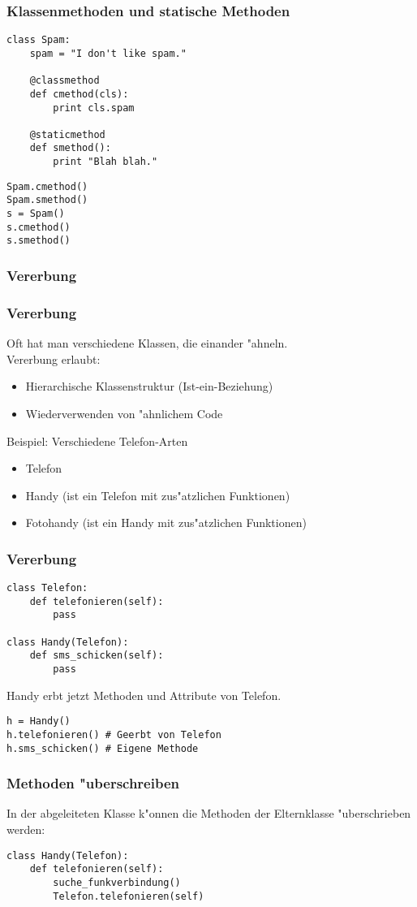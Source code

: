 \begin{frame}[fragile]
\frametitle{Klassenmethoden und statische Methoden}
\begin{lstlisting}[style=Python]
class Spam:
    spam = "I don't like spam."

    @classmethod
    def cmethod(cls):
        print cls.spam
       
    @staticmethod
    def smethod():
        print "Blah blah."
\end{lstlisting}
\begin{lstlisting}[style=Python]
Spam.cmethod()
Spam.smethod()
s = Spam()
s.cmethod()
s.smethod()
\end{lstlisting}
\end{frame}
\frametitle{Vererbung}

\begin{frame}
\frametitle{Vererbung}
Oft hat man verschiedene Klassen, die einander "ahneln.\\
\alert{Vererbung} erlaubt:
\begin{itemize}
\item Hierarchische Klassenstruktur (Ist-ein-Beziehung)
\item Wiederverwenden von "ahnlichem Code
\end{itemize}
\vspace{5mm}
Beispiel: Verschiedene Telefon-Arten
\begin{itemize}
\item Telefon
\item Handy (ist ein Telefon mit zus"atzlichen Funktionen)
\item Fotohandy (ist ein Handy mit zus"atzlichen Funktionen)
\end{itemize}
\end{frame}

\begin{frame}[fragile]
\frametitle{Vererbung}
\begin{lstlisting}[style=Python]
class Telefon:
    def telefonieren(self):
        pass

class Handy(Telefon):
    def sms_schicken(self):
        pass
\end{lstlisting}
Handy erbt jetzt Methoden und Attribute von Telefon.
\begin{lstlisting}[style=Python]
h = Handy()
h.telefonieren() # Geerbt von Telefon
h.sms_schicken() # Eigene Methode
\end{lstlisting}
\end{frame}

\begin{frame}[fragile]
\frametitle{Methoden "uberschreiben}
In der abgeleiteten Klasse k"onnen die Methoden der Elternklasse "uberschrieben werden:
\begin{lstlisting}[style=Python]
class Handy(Telefon):
    def telefonieren(self):
        suche_funkverbindung()
        Telefon.telefonieren(self)
\end{lstlisting}
\end{frame}

